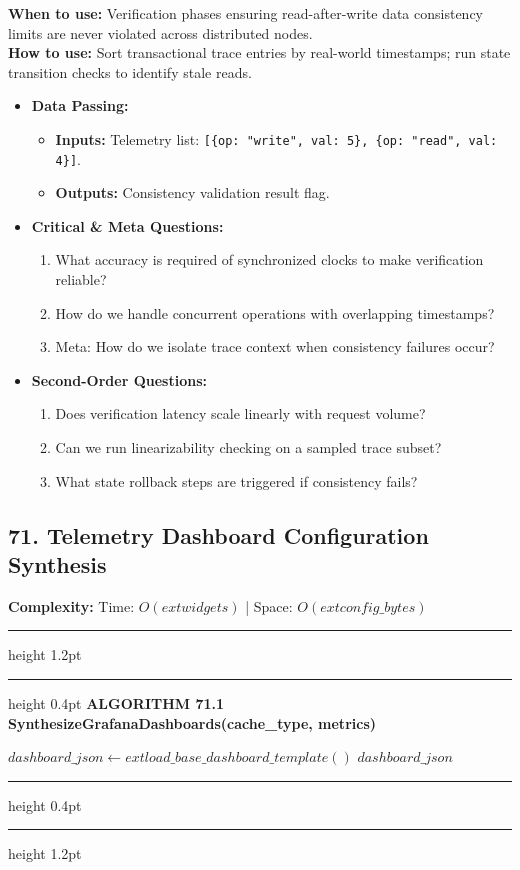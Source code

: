 \documentclass[11pt,a4paper]{article}
\newenvironment{textbookalgo}[2]{%
  \par\addvspace{1.2em}\noindent
  \hrule height 1.2pt
  \vspace{1.5pt}
  \hrule height 0.4pt
  \vspace{5pt}
  {\noindent\large\bfseries\sffamily ALGORITHM #1 \quad #2}
  \par\vspace{5pt}
  \RestyleAlgo{plain}
}{%
  \par\vspace{4pt}
  \hrule height 0.4pt
  \vspace{1.5pt}
  \hrule height 1.2pt
  \par\addvspace{1.2em}
}
\theoremstyle{definition}
\begin{document}
\noindent
\textbf{When to use:} Verification phases ensuring read-after-write data consistency limits are never violated across distributed nodes.\\
\textbf{How to use:} Sort transactional trace entries by real-world timestamps; run state transition checks to identify stale reads.
\begin{itemize}[leftmargin=*]
  \item[] \textbf{Data Passing:}
    \begin{itemize}
      \item \textbf{Inputs:} Telemetry list: \texttt{[\{op: "write", val: 5\}, \{op: "read", val: 4\}]}.
      \item \textbf{Outputs:} Consistency validation result flag.
    \end{itemize}
  \item[] \textbf{Critical \& Meta Questions:}
  \begin{enumerate}
    \item What accuracy is required of synchronized clocks to make verification reliable?
    \item How do we handle concurrent operations with overlapping timestamps?
    \item Meta: How do we isolate trace context when consistency failures occur?
  \end{enumerate}
  \item[] \textbf{Second-Order Questions:}
  \begin{enumerate}
    \item Does verification latency scale linearly with request volume?
    \item Can we run linearizability checking on a sampled trace subset?
    \item What state rollback steps are triggered if consistency fails?
  \end{enumerate}
\end{itemize}
\medskip

\clearpage
\subsection{71. Telemetry Dashboard Configuration Synthesis}


\noindent
\textbf{Complexity:} Time: $O(	ext{widgets})$ | Space: $O(	ext{config\_bytes})$
\smallskip

\begin{textbookalgo}{71.1}{SynthesizeGrafanaDashboards(cache\_type, metrics)}
\begin{algorithm}[H]
$dashboard\_json \leftarrow 	ext{load\_base\_dashboard\_template}()$\;
\Return $dashboard\_json$\;
\end{algorithm}
\end{textbookalgo}
\end{document}
